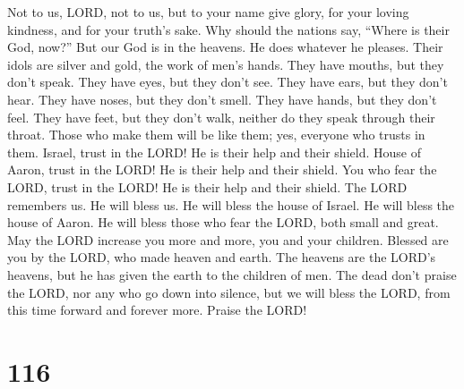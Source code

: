  Not to us, LORD, not to us, but to your name give glory,
for your loving kindness, and for your truth's sake.  Why
should the nations say, ``Where is their God, now?''  But
our God is in the heavens. He does whatever he pleases. 
Their idols are silver and gold, the work of men's hands. 
They have mouths, but they don't speak. They have eyes, but they don't
see.  They have ears, but they don't hear. They have noses,
but they don't smell.  They have hands, but they don't feel.
They have feet, but they don't walk, neither do they speak through their
throat.  Those who make them will be like them; yes,
everyone who trusts in them.  Israel, trust in the LORD! He
is their help and their shield.  House of Aaron, trust in
the LORD! He is their help and their shield.  You who fear
the LORD, trust in the LORD! He is their help and their shield.
 The LORD remembers us. He will bless us. He will bless the
house of Israel. He will bless the house of Aaron.  He will
bless those who fear the LORD, both small and great.  May
the LORD increase you more and more, you and your children.
 Blessed are you by the LORD, who made heaven and earth.
 The heavens are the LORD's heavens, but he has given the
earth to the children of men.  The dead don't praise the
LORD, nor any who go down into silence,  but we will bless
the LORD, from this time forward and forever more. Praise the LORD!

\hypertarget{section-108}{%
\section{116}\label{section-108}}

